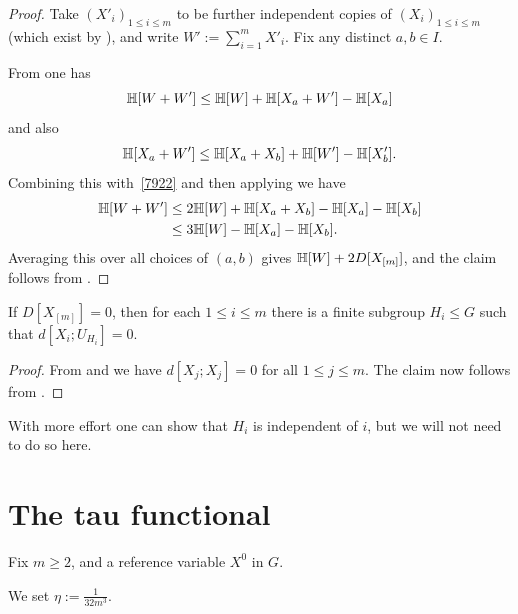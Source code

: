 \begin{proof}\leanok
  Take $(X'_i)_{1 \leq i \leq m}$ to be further independent copies of $(X_i)_{1 \leq i \leq m}$ (which exist by ), and write $W' := \sum_{i=1}^m X'_i$.
  Fix any distinct $a,b \in I$.

  From  one has
  \begin{equation}\label{7922}
    \mathbb{H}[W + W'] \leq  \mathbb{H}[W] + \mathbb{H}[X_{a} + W'] - \mathbb{H}[X_{a}]
   \end{equation}
   and also
   \[ \mathbb{H}[X_a + W'] \leq \mathbb{H}[X_a + X_b] + \mathbb{H}[W'] - \mathbb{H}[X'_b].\]
   Combining this with~\eqref{7922} and then applying  we have
   \begin{align*}  \mathbb{H}[W + W']  & \leq    2\mathbb{H}[W] + \mathbb{H}[X_a + X_b]  - \mathbb{H}[X_a] - \mathbb{H}[X_b] \\ & \leq
    3 \mathbb{H}[W] - \mathbb{H}[X_a] - \mathbb{H}[X_b].
  \end{align*}
  Averaging this over all choices of $(a,b)$ gives $\mathbb{H}[W] + 2 D[X_{[m]}]$, and the claim follows from .
\end{proof}

\begin{proposition}[Vanishing]\label{multi-zero}\leanok
If $D[X_{[m]}]=0$, then for each $1 \leq i \leq m$ there is a finite subgroup $H_i \leq G$ such that $d[X_i; U_{H_i}] = 0$.
\end{proposition}

\begin{proof}\leanok  From  and  we have $d[X_j; X_j]=0$ for all $1 \leq j \leq m$.  The claim now follows from .
\end{proof}

With more effort one can show that $H_i$ is independent of $i$, but we will not need to do so here.

\section{The tau functional}

Fix $m \geq 2$, and a reference variable $X^0$ in $G$.

\begin{definition}[$\eta$]\label{eta-def-multi}\leanok
We set $\eta := \frac{1}{32m^3}$.
\end{definition}

